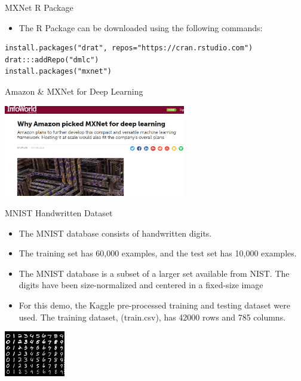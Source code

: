 \documentclass[ignorenonframetext,]{beamer}
\providecommand{\tightlist}{%
\setlength{\itemsep}{0pt}\setlength{\parskip}{0pt}}
\begin{document}
\begin{frame}[fragile]{MXNet R Package}

\begin{itemize}
\tightlist
\item
  The R Package can be downloaded using the following commands:
\end{itemize}

\begin{verbatim}
install.packages("drat", repos="https://cran.rstudio.com")
drat:::addRepo("dmlc")
install.packages("mxnet")
\end{verbatim}

\end{frame}

\begin{frame}{Amazon \& MXNet for Deep Learning}

\includegraphics[width=300px]{images/amazon_mxnet}

\end{frame}

\begin{frame}{MNIST Handwritten Dataset}

\begin{itemize}
\tightlist
\item
  The MNIST database consists of handwritten digits.
\item
  The training set has 60,000 examples, and the test set has 10,000
  examples.
\item
  The MNIST database is a subset of a larger set available from NIST.
  The digits have been size-normalized and centered in a fixed-size
  image
\item
  For this demo, the Kaggle pre-processed training and testing dataset
  were used. The training dataset, (train.csv), has 42000 rows and 785
  columns.
\end{itemize}

\begin{center}

\includegraphics[width=100px]{images/mnist} 
\end{center}

\end{frame}
\end{document}
